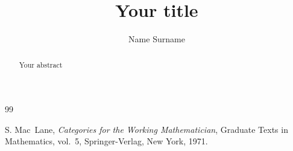 \documentclass[a4paper,10pt]{easychair}
\title{Your title}
\author{Name Surname}
\institute{Your affiliation}
\begin{document}
\maketitle

\begin{abstract}
Your abstract
\end{abstract}

\begin{thebibliography}{99}

S. Mac~Lane,
\emph{Categories for the Working Mathematician},
Graduate Texts in Mathematics, vol.~5,
Springer-Verlag, New York, 1971.

\end{thebibliography}
\end{document}
